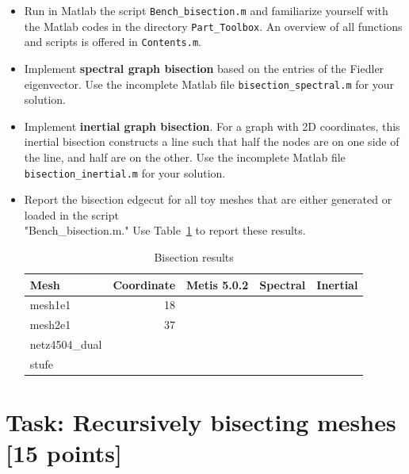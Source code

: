 \documentclass[unicode,11pt,a4paper,oneside,numbers=endperiod,openany]{scrartcl}
\begin{document}
\begin{itemize}

\item Run in Matlab the script \texttt{Bench\_bisection.m} and familiarize yourself with the Matlab codes in the directory \texttt{Part\_Toolbox}. An overview of all functions and scripts is offered in \texttt{Contents.m}. 

\item Implement \textbf{spectral graph bisection} based on the entries of the Fiedler eigenvector. Use the incomplete Matlab file \texttt{bisection\_spectral.m} for your solution.

\item Implement \textbf{inertial graph bisection}. For a graph with 2D coordinates, this inertial bisection constructs a line such that half the nodes are on one side of the line, and half are on the other.
Use the incomplete Matlab file \texttt{bisection\_inertial.m} for your solution.
 
\item Report the bisection edgecut for all toy meshes that are either generated or loaded in the script \\ "Bench\_bisection.m." Use Table~\ref{table:bisection} to report these results.

\begin{table}[h]
\caption{Bisection results}
\centering
\begin{tabular}{l|r|r|r|r} \hline\hline 
Mesh             &  Coordinate           & Metis 5.0.2  & Spectral & Inertial  \\ \hline
mesh1e1          &   18                   &             &          &           \\             
mesh2e1          &   37                   &             &          &           \\ 
netz4504\_dual   &                        &             &          &           \\ 
stufe            &                        &             &          &           \\ 
\hline \hline
\end{tabular}
\label{table:bisection}
\end{table}

\end{itemize}




\section{Task: Recursively bisecting meshes [15 points]}
\end{document}
